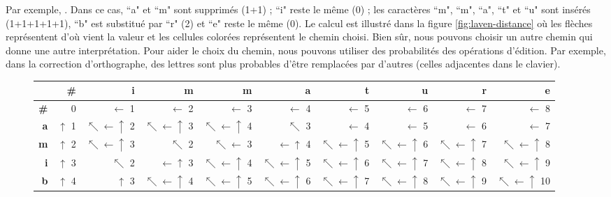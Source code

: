 \documentclass{KodeBook}
\begin{document}
Par exemple, . 
Dans ce cas, ``a" et ``m" sont supprimés (1+1) ; ``i" reste le même (0) ; les caractères ``m", ``m", ``a", ``t" et ``u"  sont insérés (1+1+1+1+1), ``b" est substitué par ``r" (2) et ``e" reste le même (0).
Le calcul est illustré dans la figure \ref{fig:laven-distance} où les flèches représentent d'où vient la valeur et les cellules colorées représentent le chemin choisi.
Bien sûr, nous pouvons choisir un autre chemin qui donne une autre interprétation.
Pour aider le choix du chemin, nous pouvons utiliser des probabilités des opérations d'édition.
Par exemple, dans la correction d'orthographe, des lettres sont plus probables d'être remplacées par d'autres (celles adjacentes dans le clavier).
\begin{figure}[ht]
	\centering
	\begin{tabular}{|r|r|r|r|r|r|r|r|r|r|}
		\hline
		&\bfseries \# &\bfseries i &\bfseries m &\bfseries m &\bfseries a &\bfseries t &\bfseries u &\bfseries r &\bfseries e \\
		\hline
		\bfseries \# & 0 & $ \leftarrow $ 1 & $ \leftarrow $ 2 & $ \leftarrow $ 3 & $ \leftarrow $ 4 & $ \leftarrow $ 5 & $ \leftarrow $ 6 & $ \leftarrow $ 7 & $ \leftarrow $ 8\\
		\hline
		\bfseries a & \cellcolor{green!25} $ \uparrow $ 1 & $ \nwarrow\leftarrow\uparrow $ 2 & $ \nwarrow\leftarrow\uparrow $ 3 & $ \nwarrow\leftarrow\uparrow $ 4 & $ \nwarrow $ 3 & $ \leftarrow $ 4 & $ \leftarrow $ 5 & $ \leftarrow $ 6 & $ \leftarrow $ 7 \\
		\hline
		\bfseries m & \cellcolor{green!25} $ \uparrow $ 2 & $ \nwarrow\leftarrow\uparrow $ 3 & $\nwarrow $ 2 & $\nwarrow\leftarrow $ 3 & $\leftarrow\uparrow $ 4 & $\nwarrow\leftarrow\uparrow $ 5 & $\nwarrow\leftarrow\uparrow $ 6 & $\nwarrow\leftarrow\uparrow $ 7 & $\nwarrow\leftarrow\uparrow $ 8\\
		\hline
		\bfseries i & $ \uparrow $ 3 & \cellcolor{green!25} $ \nwarrow $ 2 & \cellcolor{green!25} $\leftarrow\uparrow $ 3 & \cellcolor{green!25} $\nwarrow\leftarrow\uparrow $ 4 & \cellcolor{green!25} $\nwarrow\leftarrow\uparrow $ 5 & \cellcolor{green!25} $\nwarrow\leftarrow\uparrow $ 6 & \cellcolor{green!25} $\nwarrow\leftarrow\uparrow $ 7 & $\nwarrow\leftarrow\uparrow $ 8 & $\nwarrow\leftarrow\uparrow $ 9\\
		\hline
		\bfseries b & $ \uparrow $ 4 & $ \uparrow $ 3 & $\nwarrow\leftarrow\uparrow $ 4 & $\nwarrow\leftarrow\uparrow $ 5 & $\nwarrow\leftarrow\uparrow $ 6 & $\nwarrow\leftarrow\uparrow $ 7 & $\nwarrow\leftarrow\uparrow $ 8 & \cellcolor{green!25} $\nwarrow\leftarrow\uparrow $ 9 & $\nwarrow\leftarrow\uparrow $ 10\\

\end{tabular}
\end{figure}
\end{document}
